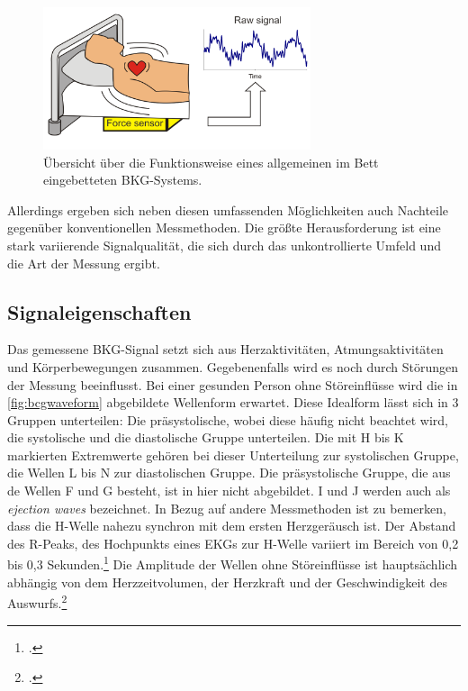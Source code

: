	 \begin{figure}[H]
	 	\centering
		\includegraphics[width=0.7\textwidth]{pic/bcgBed.png}
		\caption[Übersicht über die Funktionsweise eines allgemeinen im Bett eingebetteten \ac{BKG}-Systems]{Übersicht über die Funktionsweise eines allgemeinen im Bett eingebetteten \ac{BKG}-Systems.\protect\footnotemark}
		\label{fig:bcgbed}
	\end{figure}
	
	Allerdings ergeben sich neben diesen umfassenden Möglichkeiten auch Nachteile gegenüber konventionellen Messmethoden. Die größte Herausforderung ist eine stark variierende Signalqualität, die sich durch das unkontrollierte Umfeld und die Art der Messung ergibt.

	\subsection{Signaleigenschaften}
	
	Das gemessene \ac{BKG}-Signal setzt sich aus Herzaktivitäten, Atmungsaktivitäten und Körperbewegungen zusammen. Gegebenenfalls wird es noch durch Störungen der Messung beeinflusst. Bei einer gesunden Person ohne Störeinflüsse wird die in \ref{fig:bcgwaveform} abgebildete Wellenform erwartet. Diese Idealform lässt sich in 3 Gruppen unterteilen: Die präsystolische, wobei diese häufig nicht beachtet wird, die systolische und die diastolische Gruppe unterteilen. Die mit H bis K markierten Extremwerte gehören bei dieser Unterteilung zur systolischen Gruppe, die Wellen L bis N zur diastolischen Gruppe. Die präsystolische Gruppe, die aus de Wellen F und G besteht, ist in hier nicht abgebildet. I und J werden auch als \textit{ejection waves} bezeichnet. In Bezug auf andere Messmethoden ist zu bemerken, dass die H-Welle nahezu synchron mit dem ersten Herzgeräusch ist. Der Abstand des R-Peaks, des Hochpunkts eines \ac{EKG}s zur H-Welle variiert im Bereich von 0,2 bis 0,3 Sekunden.\footcite[Vgl.][]{DELALLA1950} Die Amplitude der Wellen ohne Störeinflüsse ist hauptsächlich abhängig von dem Herzzeitvolumen, der Herzkraft und der Geschwindigkeit des Auswurfs.\footcite[Vgl.][]{Pinheiro2010}
	
